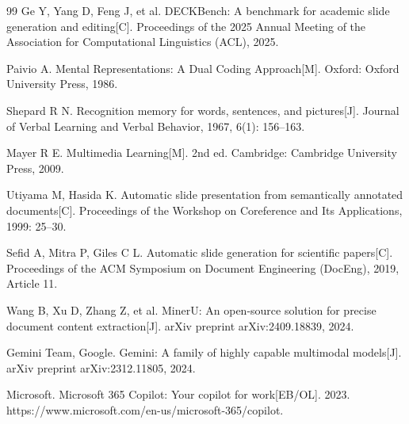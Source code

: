 \begin{thebibliography}{99}
    Ge Y, Yang D, Feng J, et al.
    DECKBench: A benchmark for academic slide generation and editing[C].
    Proceedings of the 2025 Annual Meeting of the Association for Computational Linguistics (ACL), 2025.

    Paivio A.
    Mental Representations: A Dual Coding Approach[M].
    Oxford: Oxford University Press, 1986.

    Shepard R N.
    Recognition memory for words, sentences, and pictures[J].
    Journal of Verbal Learning and Verbal Behavior, 1967, 6(1): 156--163.

    Mayer R E.
    Multimedia Learning[M].
    2nd ed. Cambridge: Cambridge University Press, 2009.

    Utiyama M, Hasida K.
    Automatic slide presentation from semantically annotated documents[C].
    Proceedings of the Workshop on Coreference and Its Applications, 1999: 25--30.

    Sefid A, Mitra P, Giles C L.
    Automatic slide generation for scientific papers[C].
    Proceedings of the ACM Symposium on Document Engineering (DocEng), 2019, Article 11.

    Wang B, Xu D, Zhang Z, et al.
    MinerU: An open-source solution for precise document content extraction[J].
    arXiv preprint arXiv:2409.18839, 2024.

    Gemini Team, Google.
    Gemini: A family of highly capable multimodal models[J].
    arXiv preprint arXiv:2312.11805, 2024.

    Microsoft.
    Microsoft 365 Copilot: Your copilot for work[EB/OL].
    2023. https://www.microsoft.com/en-us/microsoft-365/copilot.

\end{thebibliography}

